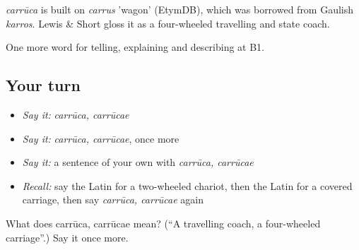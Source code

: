 \begin{cousinweb}
\emph{carrūca} is built on \emph{carrus} 'wagon' (EtymDB), which was borrowed from Gaulish \emph{karros}. Lewis \& Short gloss it as a four-wheeled travelling and state coach.
\end{cousinweb}

\begin{grammarlens}[title={What you've built}]
One more word for telling, explaining and describing at B1.
\end{grammarlens}

\subsection*{Your turn}
\begin{itemize}
\raggedright
  \item \emph{Say it:} \emph{carrūca, carrūcae}
  \item \emph{Say it:} \emph{carrūca, carrūcae}, once more
  \item \emph{Say it:} a sentence of your own with \emph{carrūca, carrūcae}
  \item \emph{Recall:} say the Latin for a two-wheeled chariot, then the Latin for a covered carriage, then say \emph{carrūca, carrūcae} again
\end{itemize}

\begin{tcolorbox}[breakable,colback=teal!4,colframe=teal!35!black,title={Before you move on}]
What does carrūca, carrūcae mean? (\textquotedblleft{}A travelling coach, a four-wheeled carriage\textquotedblright{}.) Say it once more.
\end{tcolorbox}
